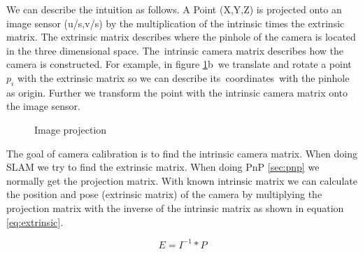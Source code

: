 \documentclass[11pt,a4paper,titlepage,oneside]{report}
\begin{document}
We can describe the intuition as follows. A Point (X,Y,Z) is projected onto an image sensor (u/s,v/s) by the multiplication of the intrinsic times the extrinsic matrix. The extrinsic matrix describes where the pinhole of the camera is located in the three dimensional space. The intrinsic camera matrix describes how the camera is constructed. For example, in figure \ref{fig:projection}b we translate and rotate a point $p_i$ with the extrinsic matrix so we can describe its coordinates with the pinhole as origin. Further we transform the point with the intrinsic camera matrix onto the image sensor.

\begin{figure}[H]
	\centering
	\caption{Image projection}\label{fig:projection}
\end{figure}

The goal of camera calibration is to find the intrinsic camera matrix. When doing SLAM we try to find the extrinsic matrix. When doing PnP \ref{sec:pnp} we normally get the projection matrix. With known intrinsic matrix we can calculate the position and pose (extrinsic matrix) of the camera by multiplying the projection matrix with the inverse of the intrinsic matrix as shown in equation \ref{eq:extrinsic}. 

\begin{equation}\label{eq:extrinsic}
	E=I^{-1}*P
\end{equation}
\end{document}
